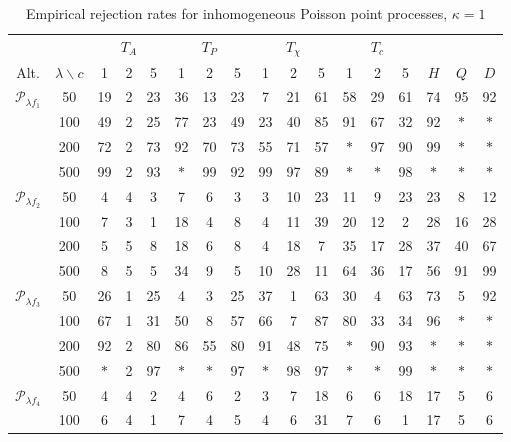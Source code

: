 \documentclass[12pt]{article}
\begin{document}
\begin{table}[p]
\centering
\caption{Empirical rejection rates for inhomogeneous Poisson point processes, $\kappa=1$}\label{tab:inh.PPP}
\renewcommand{\tabcolsep}{1.7mm}
\small
\begin{tabular}{c|c|ccc|ccc|ccc|ccc|ccc}
\multicolumn{2}{c}{} & \multicolumn{3}{c}{$T_A$} & \multicolumn{3}{c}{$T_P$} & \multicolumn{3}{c}{$T_\chi$} & \multicolumn{3}{c}{$T_c$} & \multicolumn{3}{c}{}\\
Alt. & $\lambda\backslash c$ & 1 & 2 & 5 & 1 & 2 & 5 & 1 & 2 & 5 & 1 & 2 & 5 & $H$ & $Q$ & $D$\\ \hline
\multirow{ 4}{*}{$\mathcal{P}_{\lambda f_1}$}
& 50  & 19 & 2 & 23 & 36 & 13 & 23 & 7  & 21 & 61 & 58 & 29 & 61 & 74 & 95 & 92 \\
& 100 & 49 & 2 & 25 & 77 & 23 & 49 & 23 & 40 & 85 & 91 & 67 & 32 & 92 & $\ast$ & $\ast$ \\
& 200 & 72 & 2 & 73 & 92 & 70 & 73 & 55 & 71 & 57 & $\ast$ & 97 & 90 & 99 & $\ast$ & $\ast$ \\
& 500 & 99 & 2 & 93 & $\ast$ & 99 & 92 & 99 & 97 & 89 & $\ast$ & $\ast$ & 98 & $\ast$ & $\ast$ & $\ast$ \\
\hline
\multirow{ 4}{*}{$\mathcal{P}_{\lambda f_2}$}
& 50  & 4 & 4 & 3 & 7  & 6 & 3 & 3  & 10 & 23 & 11 & 9  & 23 & 23 & 8 & 12\\
& 100 & 7 & 3 & 1 & 18 & 4 & 8 & 4  & 11 & 39 & 20 & 12 & 2  & 28 & 16& 28\\
& 200 & 5 & 5 & 8 & 18 & 6 & 8 & 4  & 18 & 7  & 35 & 17 & 28 & 37 & 40 & 67\\
& 500 & 8 & 5 & 5 & 34 & 9 & 5 & 10 & 28 & 11 & 64 & 36 & 17 & 56& 91 & 99\\
\hline
\multirow{ 4}{*}{$\mathcal{P}_{\lambda f_3}$}
& 50  & 26     & 1 & 25 & 4      & 3      & 25 & 37     & 1  & 63 & 30     & 4      & 63 & 73 & 5 & 92 \\
& 100 & 67     & 1 & 31 & 50     & 8      & 57 & 66     & 7  & 87 & 80     & 33     & 34 & 96 & $\ast$ & $\ast$ \\
& 200 & 92     & 2 & 80 & 86     & 55     & 80 & 91     & 48 & 75 & $\ast$ & 90     & 93 & $\ast$ & $\ast$ & $\ast$ \\
& 500 & $\ast$ & 2 & 97 & $\ast$ & $\ast$ & 97 & $\ast$ & 98 & 97 & $\ast$ & $\ast$ & 99 & $\ast$ & $\ast$ & $\ast$ \\
\hline
\multirow{ 4}{*}{$\mathcal{P}_{\lambda f_4}$}
& 50  & 4 & 4 & 2 & 4 & 6 & 2 & 3  & 7 & 18 & 6 & 6 & 18 & 17 & 5  &  6\\
& 100 & 6 & 4 & 1 & 7 & 4 & 5 & 4 & 6 & 31 & 7 & 6 & 1 & 17 & 5 & 6 \\

\end{tabular}
\end{table}
\end{document}
